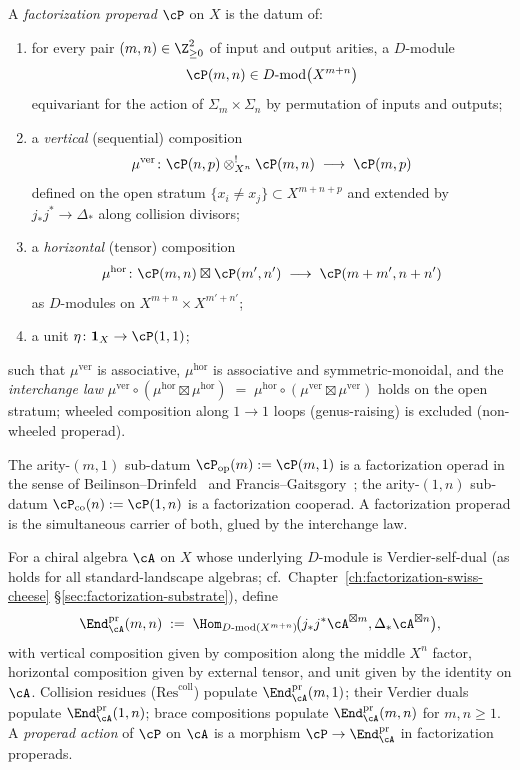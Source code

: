 \begin{definition}\label{def:factorization-properad}
%
A \emph{factorization properad} $\cP$ on $X$ is the datum of:
\begin{enumerate}
\item[(P1)] for every pair $(m,n)\in\Z_{\geq 0}^2$ of input and
 output arities, a $D$-module
 \[
 \cP(m,n)\in D\text{-mod}\bigl(X^{m+n}\bigr)
 \]
 equivariant for the action of $\Sigma_m\times\Sigma_n$ by
 permutation of inputs and outputs;
\item[(P2)] a \emph{vertical} (sequential) composition
 \[
 \mu^{\mathrm{ver}}\colon
 \cP(n,p)\otimes^!_{X^n}\cP(m,n)\;\longrightarrow\;\cP(m,p)
 \]
 defined on the open stratum
 $\{x_i\neq x_j\}\subset X^{m+n+p}$ and extended by $j_*j^*\to\Delta_*$
 along collision divisors;
\item[(P3)] a \emph{horizontal} (tensor) composition
 \[
 \mu^{\mathrm{hor}}\colon
 \cP(m,n)\boxtimes \cP(m',n')\;\longrightarrow\;\cP(m+m',n+n')
 \]
 as $D$-modules on $X^{m+n}\times X^{m'+n'}$;
\item[(P4)] a unit $\eta\colon \mathbf{1}_X\to\cP(1,1)$;
\end{enumerate}
such that $\mu^{\mathrm{ver}}$ is associative, $\mu^{\mathrm{hor}}$
is associative and symmetric-monoidal, and the
\emph{interchange law}
$
 \mu^{\mathrm{ver}}\circ(\mu^{\mathrm{hor}}\boxtimes
 \mu^{\mathrm{hor}})
 \;=\;
 \mu^{\mathrm{hor}}\circ(\mu^{\mathrm{ver}}\boxtimes \mu^{\mathrm{ver}})
$
holds on the open stratum; wheeled composition along $1\to 1$ loops
(genus-raising) is excluded (non-wheeled properad).
\end{definition}

The arity-$(m,1)$ sub-datum
$\cP_{\mathrm{op}}(m):=\cP(m,1)$ is a factorization operad in the
sense of Beilinson--Drinfeld~\cite{BD04} and Francis--Gaitsgory~\cite{FG12};
the arity-$(1,n)$ sub-datum $\cP_{\mathrm{co}}(n):=\cP(1,n)$
is a factorization cooperad. A factorization properad is the
simultaneous carrier of both, glued by the interchange law.

\begin{example}
\label{ex:endomorphism-properad}
For a chiral algebra $\cA$ on $X$ whose underlying $D$-module is
Verdier-self-dual (as holds for all standard-landscape algebras;
cf.\ Chapter~\ref{ch:factorization-swiss-cheese} \S\ref{sec:factorization-substrate}),
define
\[
 \End^{\mathrm{pr}}_\cA(m,n)
 \;:=\;
 \Hom_{D\text{-mod}(X^{m+n})}\!\bigl(j_*j^*\cA^{\boxtimes m},
 \Delta_*\cA^{\boxtimes n}\bigr),
\]
with vertical composition given by composition along the middle
$X^n$ factor, horizontal composition given by external tensor,
and unit given by the identity on $\cA$. Collision residues
($\mathrm{Res}^{\mathrm{coll}}$) populate $\End^{\mathrm{pr}}_\cA(m,1)$;
their Verdier duals populate $\End^{\mathrm{pr}}_\cA(1,n)$; brace
compositions populate $\End^{\mathrm{pr}}_\cA(m,n)$ for $m,n\geq 1$.
A \emph{properad action} of $\cP$ on $\cA$ is a morphism
$\cP\to\End^{\mathrm{pr}}_\cA$ in factorization properads.
\end{example}

